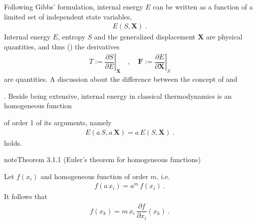 \documentclass[letterpaper,10pt,english]{jupyterBook}
\begin{document}
\sphinxAtStartPar
Following Gibbs’ formulation, internal energy \(E\) can be written as a function of a limited set of independent state variables,
\begin{equation*}
\begin{split}E(S, \mathbf{X}) \ .\end{split}
\end{equation*}
\sphinxAtStartPar
Internal energy \(E\), entropy \(S\) and the generalized displacement \(\mathbf{X}\) are  physical quantities, and thus () the derivatives
\begin{equation*}
\begin{split}T := \left.\dfrac{\partial S}{\partial E}\right|_{\mathbf{X}} \quad , \quad \mathbf{F} := \left.\dfrac{\partial E}{\partial \mathbf{X}}\right|_S\end{split}
\end{equation*}
\sphinxAtStartPar
are  quantities. A discussion about the difference between the concept of  and %
\begin{footnote}[1]\sphinxAtStartFootnote
{}
%
\end{footnote}.
Beside being extensive, internal energy in classical thermodynamics is an homogeneous function%
\begin{footnote}[2]\sphinxAtStartFootnote
{}
%
\end{footnote} of order 1 of its arguments, namely
\begin{equation*}
\begin{split}E(a \, S, a \, \mathbf{X}) = a \, E(S, \mathbf{X}) \ .\end{split}
\end{equation*}
\sphinxAtStartPar
{} holds.
\label{ch/potentials:thm-euler}
\begin{sphinxadmonition}{note}{Theorem 3.1.1 (Euler’s theorem for homogeneous functions)}



\sphinxAtStartPar
Let \(f(x_i)\) and homogeneous function of order \(m\), i.e.
\begin{equation}\label{equation:ch/potentials:eq:homogeneous-fun:def}
\begin{split}f(a \, x_i) = a^m \, f(x_i) \ .\end{split}
\end{equation}
\sphinxAtStartPar
It follows that
\begin{equation*}
\begin{split}f(x_k) = m \, x_i \, \dfrac{\partial f}{\partial x_i}(x_k) \ .\end{split}
\end{equation*}\end{sphinxadmonition}
\end{document}
